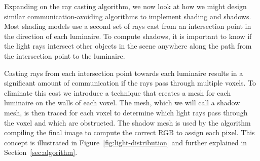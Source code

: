 Expanding on the ray casting algorithm, we now look at how we might design 
similar communication-avoiding algorithms to implement shading and shadows.  
Most shading models use a second set of rays cast from an intersection point in 
the direction of each luminaire.  To compute shadows, it is important to know 
if the light rays intersect other objects in the scene anywhere along the path
from the intersection point to the luminaire.  

Casting rays from each intersection point towards each luminaire results in
a significant amount of communication if the rays pass through multiple voxels.
To eliminate this cost we introduce a technique that creates a mesh for each 
luminaire on the walls of each voxel.  The mesh, which we will call a shadow
mesh, is then traced for each voxel to determine which light rays pass through
the voxel and which are obstructed.  The shadow mesh is used by the algorithm
compiling the final image to compute the correct RGB to assign each pixel. This
concept is illustrated in Figure~\ref{fig:light-distribution} and further
explained in Section~\ref{sec:algorithm}.

